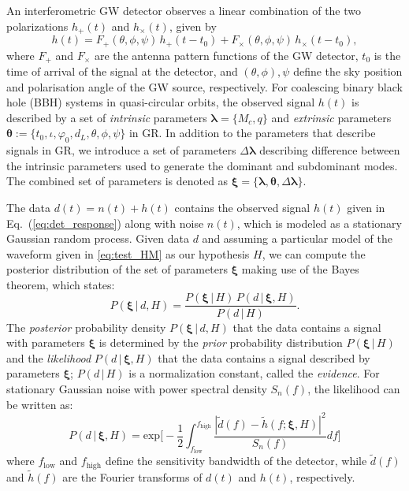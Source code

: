 \documentclass[prl,preprintnumbers,twocolumn,eqsecnum,floatfix,a4paper,nofootinbib,superscriptaddress]{revtex4}
\newcommand{\blambda}{\bm{\lambda}}
\newcommand{\btheta}{\bm{\theta}}
\newcommand{\bxi}{\bm{\xi}}
\begin{document}
An interferometric GW detector observes a linear combination of the two polarizations $h_+(t)$ and $h_\times(t)$, given by 
\begin{equation}
h(t) = F_+(\theta, \phi, \psi) \, h_+(t-t_0) + F_{\times}(\theta, \phi, \psi)\, {h}_{\times}(t-t_0), 
\label{eq:det_response}
\end{equation}
where $F_+$ and $F_\times$ are the antenna pattern functions of the GW detector, $t_0$ is the time of arrival of the signal at the detector, and $(\theta, \phi), \psi$ define the sky position and polarisation angle of the GW source, respectively. For coalescing binary black hole (BBH) systems in quasi-circular orbits, the observed signal $h(t)$ is described by a set of \emph{intrinsic} parameters $\blambda = \{M_c, q\}$ and \emph{extrinsic} parameters  $\btheta := \{t_0, \iota, \varphi_0, d_L, \theta, \phi, \psi\}$ in GR. 
In addition to the parameters that describe signals in GR, we introduce a set of parameters $\Delta \blambda$ describing difference between the intrinsic parameters used to generate the dominant and subdominant modes. The combined set of parameters is denoted as $\bxi = \{\blambda, \btheta, \Delta \blambda\}$. 

The data $d(t) = n(t) + h(t)$ contains the observed signal $h(t)$ given in Eq.~(\ref{eq:det_response}) along with noise $n(t)$, which is modeled as a stationary Gaussian random process.
Given data $d$ and assuming a particular model of the waveform given in \eqref{eq:test_HM} as our hypothesis $H$, we can compute the posterior distribution of the set of parameters ${\bxi}$ making use of the Bayes theorem, which states: 
\begin{equation}
P({\bxi} \, | \, d, H) = \frac{P({\bxi} \, | \, H) \, P (d \, | \, {\bxi}, H)}{P(d \, | \, H)}.
\label{eq:Bayes_theorem}
\end{equation} 
The \emph{posterior} probability density $P({\bxi}\,|\,d,H)$ that the data contains a signal with parameters $\bxi$ is determined by the \emph{prior} probability distribution $P({\bxi} \, | \, H)$ and the \emph{likelihood} $P (d \, | \, {\bxi}, H)$ that the data contains a signal described by parameters $\bxi$; $P(d \, | \, H)$ is a normalization constant, called the \emph{evidence}. For stationary Gaussian noise with power spectral density $S_n(f)$, the likelihood can be written as:
\begin{equation}
P (d \, | \, {\bxi}, H) = \text{exp}\Big[ -\frac{1}{2}\int_{f_\mathrm{low}}^{f_\mathrm{high}} \frac{|\tilde{d}(f) - \tilde{h}(f;{\bxi}, H)|^2}{S_n(f)}df\Big]
\end{equation}
where $f_\mathrm{low}$ and $f_\mathrm{high}$ define the sensitivity bandwidth of the detector, while $\tilde{d}(f)$ and $\tilde{h}(f)$ are the Fourier transforms of $d(t)$ and $h(t)$, respectively. 
\end{document}
